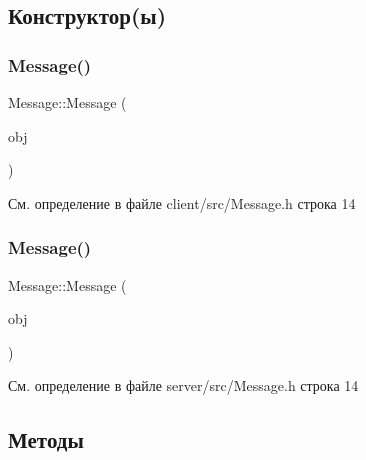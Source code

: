\subsection{Конструктор(ы)}
\mbox{\label{class_message_ab24cdb2c9890d77e46a333f157e4f66d}} 
\subsubsection{\texorpdfstring{Message()}{Message()}\hspace{0.1cm}{\footnotesize\ttfamily [1/2]}}
{\footnotesize\ttfamily Message\+::\+Message (\begin{DoxyParamCaption}\item[{\mbox{\hyperlink{class_message_object}{Message\+Object}}}]{obj }\end{DoxyParamCaption})\hspace{0.3cm}{\ttfamily [inline]}}



См. определение в файле client/src/\+Message.\+h строка 14

\mbox{\label{class_message_ab24cdb2c9890d77e46a333f157e4f66d}} 
\subsubsection{\texorpdfstring{Message()}{Message()}\hspace{0.1cm}{\footnotesize\ttfamily [2/2]}}
{\footnotesize\ttfamily Message\+::\+Message (\begin{DoxyParamCaption}\item[{\mbox{\hyperlink{class_message_object}{Message\+Object}}}]{obj }\end{DoxyParamCaption})\hspace{0.3cm}{\ttfamily [inline]}}



См. определение в файле server/src/\+Message.\+h строка 14



\subsection{Методы}
\mbox{\label{class_message_a5e0807f65e54b9db9a9144d96c23c859}} 
